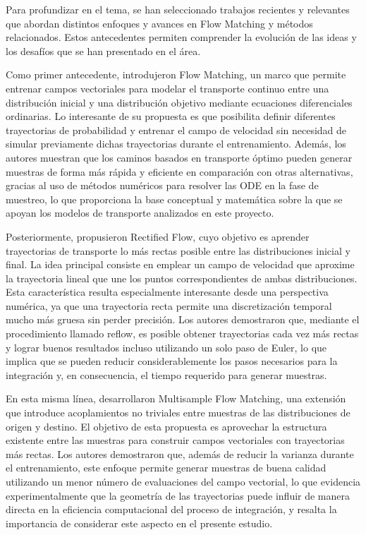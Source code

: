 \documentclass[final,5p,times,twocolumn,authoryear]{elsarticle}
\begin{document}
Para profundizar en el tema, se han seleccionado trabajos recientes y relevantes que abordan distintos enfoques y avances en Flow Matching y métodos relacionados. Estos antecedentes permiten comprender la evolución de las ideas y los desafíos que se han presentado en el área.

Como primer antecedente, \citet{lipman2022flow} introdujeron Flow Matching, un marco que permite entrenar campos vectoriales para modelar el transporte continuo entre una distribución inicial y una distribución objetivo mediante ecuaciones diferenciales ordinarias. Lo interesante de su propuesta es que posibilita definir diferentes trayectorias de probabilidad y entrenar el campo de velocidad sin necesidad de simular previamente dichas trayectorias durante el entrenamiento. Además, los autores muestran que los caminos basados en transporte óptimo pueden generar muestras de forma más rápida y eficiente en comparación con otras alternativas, gracias al uso de métodos numéricos para resolver las ODE en la fase de muestreo, lo que proporciona la base conceptual y matemática sobre la que se apoyan los modelos de transporte analizados en este proyecto.

Posteriormente, \citet{liu2022flow} propusieron Rectified Flow, cuyo objetivo es aprender trayectorias de transporte lo más rectas posible entre las distribuciones inicial y final. La idea principal consiste en emplear un campo de velocidad que aproxime la trayectoria lineal que une los puntos correspondientes de ambas distribuciones. Esta característica resulta especialmente interesante desde una perspectiva numérica, ya que una trayectoria recta permite una discretización temporal mucho más gruesa sin perder precisión. Los autores demostraron que, mediante el procedimiento llamado reflow, es posible obtener trayectorias cada vez más rectas y lograr buenos resultados incluso utilizando un solo paso de Euler, lo que implica que se pueden reducir considerablemente los pasos necesarios para la integración y, en consecuencia, el tiempo requerido para generar muestras.

En esta misma línea, \citet{pooladian2023multisample} desarrollaron Multisample Flow Matching, una extensión que introduce acoplamientos no triviales entre muestras de las distribuciones de origen y destino. El objetivo de esta propuesta es aprovechar la estructura existente entre las muestras para construir campos vectoriales con trayectorias más rectas. Los autores demostraron que, además de reducir la varianza durante el entrenamiento, este enfoque permite generar muestras de buena calidad utilizando un menor número de evaluaciones del campo vectorial, lo que evidencia experimentalmente que la geometría de las trayectorias puede influir de manera directa en la eficiencia computacional del proceso de integración, y resalta la importancia de considerar este aspecto en el presente estudio.
\end{document}
